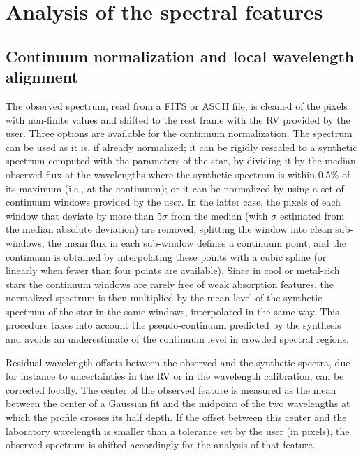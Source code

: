 \documentclass{aa}
\begin{document}
\section{Analysis of the spectral features}
\label{sec:method}

\subsection{Continuum normalization and local wavelength alignment}
\label{sec:norm}

The observed spectrum, read from a FITS or ASCII file, is cleaned of
the pixels with non-finite values and shifted to the rest frame with
the RV provided by the user. Three options are available for the
continuum normalization. The spectrum can be used as it is, if already
normalized; it can be rigidly rescaled to a synthetic spectrum
computed with the parameters of the star, by dividing it by the median
observed flux at the wavelengths where the synthetic spectrum is within
0.5\% of its maximum (i.e., at the continuum); or it can be normalized
by using a set of continuum windows provided by the user. In the latter
case, the pixels of each window that deviate by more than $5\sigma$
from the median (with $\sigma$ estimated from the median absolute
deviation) are removed, splitting the window into clean sub-windows,
the mean flux in each sub-window defines a continuum point, and the
continuum is obtained by interpolating these points with a cubic spline
(or linearly when fewer than four points are available). Since in
cool or metal-rich stars the continuum windows are rarely free of weak
absorption features, the normalized spectrum is then multiplied by the
mean level of the synthetic spectrum of the star in the same windows,
interpolated in the same way. This procedure takes into account the
pseudo-continuum predicted by the synthesis and avoids an
underestimate of the continuum level in crowded spectral regions.

Residual wavelength offsets between the observed and the synthetic
spectra, due for instance to uncertainties in the RV or in the
wavelength calibration, can be corrected locally. The center of the
observed feature is measured as the mean between the center of a
Gaussian fit and the midpoint of the two wavelengths at which the
profile crosses its half depth. If the offset between this center and
the laboratory wavelength is smaller than a tolerance set by the user
(in pixels), the observed spectrum is shifted accordingly for the
analysis of that feature.
\end{document}
